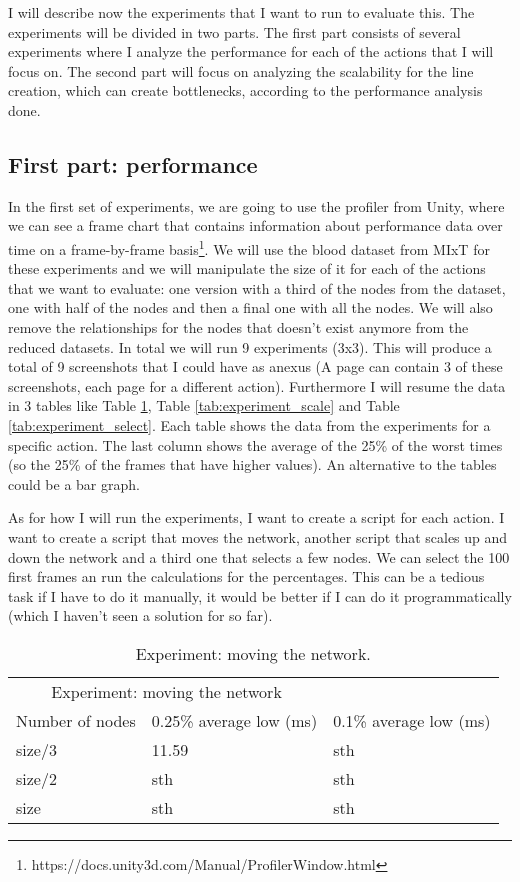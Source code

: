 I will describe now the experiments that I want to run to evaluate this. The experiments will be divided in two parts. The first part consists of several experiments where I analyze the performance for each of the actions that I will focus on. The second part will focus on analyzing the scalability for the line creation, which can create bottlenecks, according to the performance analysis done.

\subsection{First part: performance}

In the first set of experiments, we are going to use the profiler from Unity, where we can see a frame chart that contains information about performance data over time on a frame-by-frame basis\footnote{https://docs.unity3d.com/Manual/ProfilerWindow.html}. We will use the blood dataset from MIxT for these experiments and we will manipulate the size of it for each of the actions that we want to evaluate: one version with a third of the nodes from the dataset, one with half of the nodes and then a final one with all the nodes. We will also remove the relationships for the nodes that doesn't exist anymore from the reduced datasets. In total we will run 9 experiments (3x3). This will produce a total of 9 screenshots that I could have as anexus (A page can contain 3 of these screenshots, each page for a different action). Furthermore I will resume the data in 3 tables like Table \ref{tab:experiment_moving}, Table \ref{tab:experiment_scale} and Table \ref{tab:experiment_select}. Each table shows the data from the experiments for a specific action. The last column shows the average of the 25\% of the worst times (so the 25\% of the frames that have higher values). An alternative to the tables could be a bar graph.

As for how I will run the experiments, I want to create a script for each action. I want to create a script that moves the network, another script that scales up and down the network and a third one that selects a few nodes. We can select the 100 first frames an run the calculations for the percentages. This can be a tedious task if I have to do it manually, it would be better if I can do it programmatically (which I haven't seen a solution for so far).

\begin{table}[h!]
\centering
\begin{tabular}{lll}
\multicolumn{2}{c}{Experiment: moving the network} \\
Number of nodes & 0.25\% average low (ms) & 0.1\% average low (ms) \\
size/3 & 11.59 & sth \\
size/2 & sth & sth \\
size & sth & sth \\
\end{tabular}
\caption{Experiment: moving the network.}
\label{tab:experiment_moving}
\end{table}

